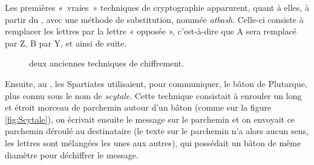 Les premières «~vraies~» techniques de cryptographie apparurent,
quant à elles, à partir du , avec une méthode de substitution,
nommée \emph{atbash}. Celle-ci consiste à remplacer les lettres par la
lettre « opposée », c'est-à-dire que A sera remplacé par Z, B par Y,
et ainsi de suite.
\begin{figure}[h]
  \centering
    \hspace{1.5cm}
    \caption{deux anciennes techniques de chiffrement.}
    \vspace{-15pt}
\end{figure}


  
Ensuite, au , les Spartiates utilisaient, pour communiquer, le
bâton de Plutarque, plus connu sous le nom de \emph{scytale}. Cette
technique consistait à enrouler un long et étroit morceau de parchemin
autour d'un bâton (comme sur la figure \ref{fig:Scytale}), on écrivait 
ensuite le message sur le parchemin et
on envoyait ce parchemin déroulé au destinataire (le texte sur le
parchemin n'a alors aucun sens, les lettres sont mélangées les
unes aux autres), qui possédait un
bâton de même diamètre pour déchiffrer le message.

